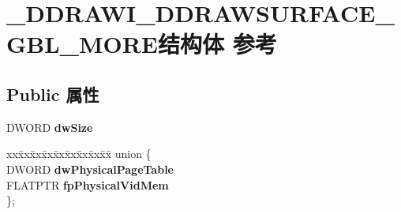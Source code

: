 \hypertarget{struct___d_d_r_a_w_i___d_d_r_a_w_s_u_r_f_a_c_e___g_b_l___m_o_r_e}{}\section{\+\_\+\+D\+D\+R\+A\+W\+I\+\_\+\+D\+D\+R\+A\+W\+S\+U\+R\+F\+A\+C\+E\+\_\+\+G\+B\+L\+\_\+\+M\+O\+R\+E结构体 参考}
\label{struct___d_d_r_a_w_i___d_d_r_a_w_s_u_r_f_a_c_e___g_b_l___m_o_r_e}
\subsection*{Public 属性}
\begin{DoxyCompactItemize}
\item 
\mbox{\label{struct___d_d_r_a_w_i___d_d_r_a_w_s_u_r_f_a_c_e___g_b_l___m_o_r_e_a8c3667ad48c78767bbc3d1a0a5d0e40f}} 
D\+W\+O\+RD {\bfseries dw\+Size}
\item 
\mbox{\label{struct___d_d_r_a_w_i___d_d_r_a_w_s_u_r_f_a_c_e___g_b_l___m_o_r_e_a420499ab49250f542bbeba0330d95f23}} 
\begin{tabbing}
xx\=xx\=xx\=xx\=xx\=xx\=xx\=xx\=xx\=\kill
union \{\\
\>DWORD {\bfseries dwPhysicalPageTable}\\
\>FLATPTR {\bfseries fpPhysicalVidMem}\\
\}; \\


\end{tabbing}
\end{DoxyCompactItemize}
